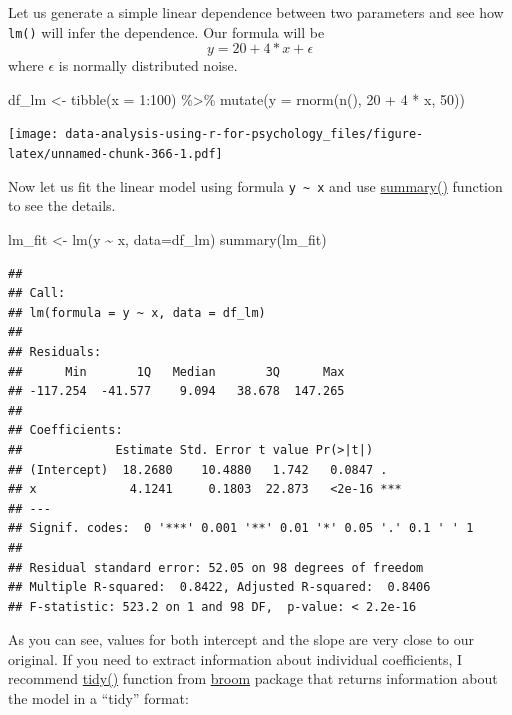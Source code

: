 \documentclass[
]{book}
\newenvironment{Shaded}{\begin{snugshade}}{\end{snugshade}}
\newcommand{\AttributeTok}[1]{\textcolor[rgb]{0.77,0.63,0.00}{#1}}
\newcommand{\DecValTok}[1]{\textcolor[rgb]{0.00,0.00,0.81}{#1}}
\newcommand{\FunctionTok}[1]{\textcolor[rgb]{0.00,0.00,0.00}{#1}}
\newcommand{\NormalTok}[1]{#1}
\newcommand{\OtherTok}[1]{\textcolor[rgb]{0.56,0.35,0.01}{#1}}
\newcommand{\SpecialCharTok}[1]{\textcolor[rgb]{0.00,0.00,0.00}{#1}}
\begin{document}
Let us generate a simple linear dependence between two parameters and see how \texttt{lm()} will infer the dependence. Our formula will be
\[ y = 20 + 4 * x + \epsilon\]
where \(\epsilon\) is normally distributed noise.

\begin{Shaded}
\begin{Highlighting}[]
\NormalTok{df\_lm }\OtherTok{\textless{}{-}}
  \FunctionTok{tibble}\NormalTok{(}\AttributeTok{x =} \DecValTok{1}\SpecialCharTok{:}\DecValTok{100}\NormalTok{) }\SpecialCharTok{\%\textgreater{}\%}
  \FunctionTok{mutate}\NormalTok{(}\AttributeTok{y =} \FunctionTok{rnorm}\NormalTok{(}\FunctionTok{n}\NormalTok{(), }\DecValTok{20} \SpecialCharTok{+} \DecValTok{4} \SpecialCharTok{*}\NormalTok{ x, }\DecValTok{50}\NormalTok{))}
\end{Highlighting}
\end{Shaded}

\texttt{[image: data-analysis-using-r-for-psychology\_files/figure-latex/unnamed-chunk-366-1.pdf]}

Now let us fit the linear model using formula \texttt{y\ \textasciitilde{}\ x} and use \href{https://stat.ethz.ch/R-manual/R-devel/library/stats/html/summary.lm.html}{summary()} function to see the details.

\begin{Shaded}
\begin{Highlighting}[]
\NormalTok{lm\_fit }\OtherTok{\textless{}{-}} \FunctionTok{lm}\NormalTok{(y }\SpecialCharTok{\textasciitilde{}}\NormalTok{ x, }\AttributeTok{data=}\NormalTok{df\_lm)}
\FunctionTok{summary}\NormalTok{(lm\_fit)}
\end{Highlighting}
\end{Shaded}

\begin{verbatim}
## 
## Call:
## lm(formula = y ~ x, data = df_lm)
## 
## Residuals:
##      Min       1Q   Median       3Q      Max 
## -117.254  -41.577    9.094   38.678  147.265 
## 
## Coefficients:
##             Estimate Std. Error t value Pr(>|t|)    
## (Intercept)  18.2680    10.4880   1.742   0.0847 .  
## x             4.1241     0.1803  22.873   <2e-16 ***
## ---
## Signif. codes:  0 '***' 0.001 '**' 0.01 '*' 0.05 '.' 0.1 ' ' 1
## 
## Residual standard error: 52.05 on 98 degrees of freedom
## Multiple R-squared:  0.8422, Adjusted R-squared:  0.8406 
## F-statistic: 523.2 on 1 and 98 DF,  p-value: < 2.2e-16
\end{verbatim}

As you can see, values for both intercept and the slope are very close to our original. If you need to extract information about individual coefficients, I recommend \href{https://broom.tidymodels.org/reference/tidy.lm.html}{tidy()} function from \href{https://github.com/tidymodels/broom}{broom} package that returns information about the model in a ``tidy'' format:
\end{document}
